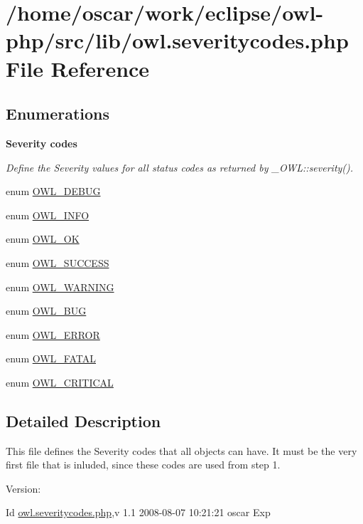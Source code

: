 \hypertarget{owl_8severitycodes_8php}{
\section{/home/oscar/work/eclipse/owl-php/src/lib/owl.severitycodes.php File Reference}
\label{owl_8severitycodes_8php}
}
\subsection*{Enumerations}
\begin{Indent}{\bf Severity codes}\par
{\em Define the Severity values for all status codes as returned by \_\-OWL::severity(). }\begin{CompactItemize}
\item 
enum \hyperlink{owl_8severitycodes_8php_df6a439e74801dd83160f085e9af5546}{OWL\_\-DEBUG} 
\item 
enum \hyperlink{owl_8severitycodes_8php_139328861128689f2f4def6a399d9057}{OWL\_\-INFO} 
\item 
enum \hyperlink{owl_8severitycodes_8php_bc72c053cfd10025fe57797c41eab18e}{OWL\_\-OK} 
\item 
enum \hyperlink{owl_8severitycodes_8php_96223f06ba27bf5cbefa6e9d702897c2}{OWL\_\-SUCCESS} 
\item 
enum \hyperlink{owl_8severitycodes_8php_ce886152e2e86cd2e91cb833fd495adb}{OWL\_\-WARNING} 
\item 
enum \hyperlink{owl_8severitycodes_8php_97e9838587d4386a48d7e40020bf0a7f}{OWL\_\-BUG} 
\item 
enum \hyperlink{owl_8severitycodes_8php_b57d46c4dff0628f7f46aa11db9325c9}{OWL\_\-ERROR} 
\item 
enum \hyperlink{owl_8severitycodes_8php_4c27106ebf80027ef1ebf953ed172e76}{OWL\_\-FATAL} 
\item 
enum \hyperlink{owl_8severitycodes_8php_4628d2e3b0d08692a62a1b8cad05465b}{OWL\_\-CRITICAL} 
\end{CompactItemize}
\end{Indent}


\subsection{Detailed Description}
This file defines the Severity codes that all objects can have. It must be the very first file that is inluded, since these codes are used from step 1. \begin{Desc}
\item[Version:]\end{Desc}
\begin{Desc}
\item[Id]\hyperlink{owl_8severitycodes_8php}{owl.severitycodes.php},v 1.1 2008-08-07 10:21:21 oscar Exp \end{Desc}


